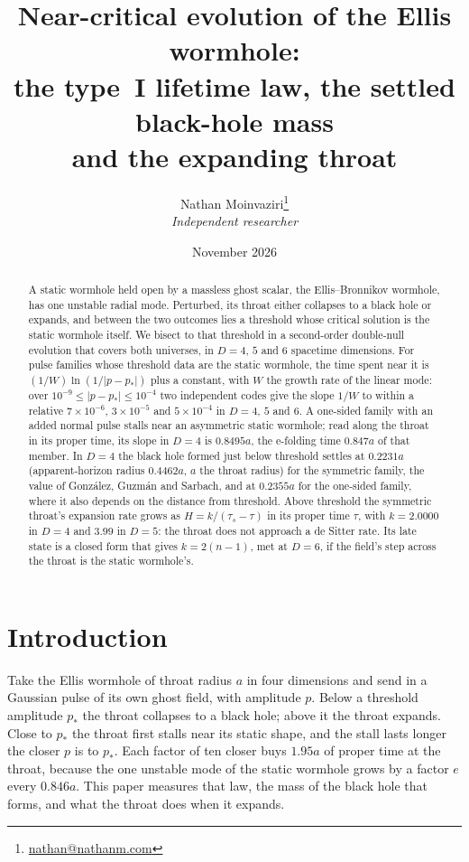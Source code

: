 \documentclass[11pt]{article}
\title{Near-critical evolution of the Ellis wormhole:\\the type~I lifetime law, the settled black-hole mass\\and the
expanding throat}
\author{Nathan Moinvaziri\thanks{\href{mailto:nathan@nathanm.com}{nathan@nathanm.com}}\\[2pt]
\normalsize\textit{Independent researcher}}
\date{November 2026}
\begin{document}
\maketitle

\begin{abstract}
A static wormhole held open by a massless ghost scalar, the Ellis--Bronnikov wormhole, has one unstable radial mode.
Perturbed, its throat either collapses to a black hole or expands, and between the two outcomes lies a threshold whose
critical solution is the static wormhole itself. We bisect to that threshold in a second-order double-null evolution that
covers both universes, in $D=4$, $5$ and $6$ spacetime dimensions. For pulse families whose threshold data are the
static wormhole, the time spent near it is $(1/W)\ln(1/|p-p_*|)$ plus a constant, with $W$ the growth rate of the
linear mode: over $10^{-9}\le|p-p_*|\le10^{-4}$ two independent codes give the slope $1/W$ to within a relative
$7\times10^{-6}$, $3\times10^{-5}$ and $5\times10^{-4}$ in $D=4$, $5$ and $6$. A one-sided family with an added
normal pulse stalls near an asymmetric static wormhole; read along the throat in its proper time, its slope in $D=4$ is
$0.8495a$, the e-folding time $0.847a$ of that member. In $D=4$ the black hole formed just below threshold settles at
$0.2231a$ (apparent-horizon radius $0.4462a$, $a$ the throat radius) for the symmetric family, the value of
Gonz\'alez, Guzm\'an and Sarbach, and at $0.2355a$ for the one-sided family, where it also depends on the distance from
threshold. Above threshold the symmetric throat's expansion rate grows as $H=k/(\tau_s-\tau)$ in its proper time $\tau$,
with $k=2.0000$ in $D=4$ and $3.99$ in $D=5$: the throat does not approach a de Sitter rate. Its late state is a closed form
that gives $k=2(n-1)$, met at $D=6$, if the field's step across the throat is the static wormhole's.
\end{abstract}

\tableofcontents

\section{Introduction}\label{sec:intro}

Take the Ellis wormhole of throat radius $a$ in four dimensions and send in a Gaussian pulse of its own ghost field,
with amplitude $p$. Below a threshold amplitude $p_*$ the throat collapses to a black hole; above it the throat expands.
Close to $p_*$ the throat first stalls near its static shape, and the stall lasts longer the closer $p$ is to $p_*$.
Each factor of ten closer buys $1.95a$ of proper time at the throat, because the one unstable mode of the static
wormhole grows by a factor $e$ every $0.846a$. This paper measures that law, the mass of the black hole that forms, and
what the throat does when it expands.
\end{document}
